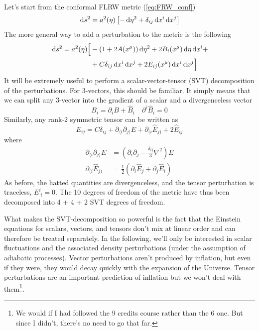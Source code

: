 Let's start from the conformal FLRW metric (\ref{eq:FRW_conf})
\begin{equation}
    \,\text{d}s^{2} = a^{2}(\eta)\left[-\,\text{d}\eta^{2} + \delta_{ij}\,\text{d}x^{i}\,\text{d}x^{j}\right]
\end{equation}
The more general way to add a perturbation to the metric is the following 
\begin{align*}
    \,\text{d}s^{2} = a^{2}(\eta)\Big[ & -(1+2A(x^{\mu}))\,\text{d}\eta^{2} + 2B_{i}(x^{\mu})\,\text{d}\eta\,\text{d}x^{i} + \\
    & + C\delta_{ij}\,\text{d}x^{i}\,\text{d}x^{j} + 2E_{ij}(x^{\mu})\,\text{d}x^{i}\,\text{d}x^{j} \Big]
\end{align*}
It will be extremely useful to perform a scalar-vector-tensor (SVT) decomposition of the perturbations. For 3-vectors, this should be familiar. It simply means that we can split any 3-vector into the gradient of a scalar and a divergenceless vector
\begin{equation}
    B_{i} = \partial_{i}B + \hat{B}_{i} \quad \partial^{i}\hat{B}_{i} = 0
\end{equation}
Similarly, any rank-2 symmetric tensor can be written as
\begin{equation}
    E_{ij} = C\delta_{ij} + \partial_{\langle i}\partial_{j \rangle}E + \partial_{( i}\hat{E}_{j)} + 2\hat{E}_{ij}
\end{equation}
where 
\begin{align*}
    \partial_{\langle i}\partial_{j \rangle}E & = \left(\partial_{i}\partial_{j} -\frac{\delta_{ij}}{3}\nabla^{2}\right)E\\
    \partial_{( i}\hat{E}_{j)} & = \frac{1}{2}\left(\partial_{i}\hat{E}_{j} + \partial_{j}\hat{E}_{i}\right)
\end{align*}
As before, the hatted quantities are divergenceless, and the tensor perturbation is traceless, $E^{i}_{\; i} = 0$. The 10 degrees of freedom of the metric have thus been decomposed into 4 + 4 + 2 SVT degrees of freedom.
\par What makes the SVT-decomposition so powerful is the fact that the Einstein equations for scalars, vectors, and tensors don’t mix at linear order and can therefore be treated separately. In the following, we'll only be interested in scalar fluctuations and the associated density perturbations (under the assumption of adiabatic processes). Vector perturbations aren’t produced by inflation, but even if they were, they would decay quickly with the expansion of the Universe. Tensor perturbations are an important prediction of inflation but we won't deal with them\footnote{We would if I had followed the 9 credits course rather than the 6 one. But since I didn't, there's no need to go that far.}.
